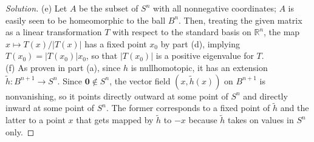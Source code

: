 \documentclass[10pt]{article}
\providecommand{\RR}{\mathbb R}
\providecommand{\mb}[1]{\mathbf{#1}}
\newenvironment{soln}{\begin{proof}[Solution]}{\end{proof}}
\providecommand{\abs}[1]{\left\lvert #1\right\rvert}
\begin{document}
\begin{soln}
    (e) Let $A$ be the subset of $S^n$ with all nonnegative coordinates;
    $A$ is easily seen to be homeomorphic to the ball $B^n$.
    Then, treating the given matrix as a linear transformation
    $T$ with respect to the standard basis on $\RR^n$,
    the map $x\mapsto T(x)/\abs{T(x)}$ has a fixed point $x_0$ by part (d),
    implying $T(x_0) = \abs{T(x_0)}x_0$, so that $\abs{T(x_0)}$
    is a positive eigenvalue for $T$.
    \\

    (f) As proven in part (a), since $h$ is nullhomotopic,
    it has an extension $\widetilde h\colon B^{n+1}\to S^n$.
    Since $\mb 0\notin S^n$, the vector field $(x,\widetilde h(x))$
    on $B^{n+1}$ is nonvanishing,
    so it points directly outward at some point of $S^n$
    and directly inward at some point of $S^n$.
    The former corresponds to a fixed point of $\widetilde h$
    and the latter to a point $x$ that gets mapped by $\widetilde h$ to $-x$
    because $\widetilde h$ takes on values in $S^n$ only.
\end{soln}
\end{document}
